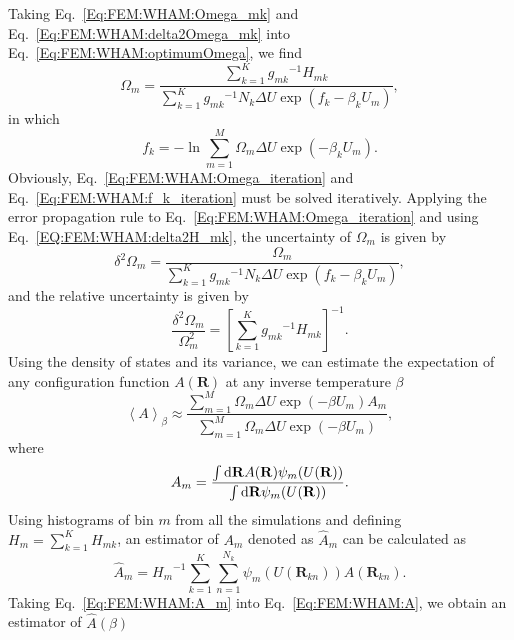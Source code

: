 Taking Eq.~\ref{Eq:FEM:WHAM:Omega_mk} and Eq.~\ref{Eq:FEM:WHAM:delta2Omega_mk} into Eq.~\ref{Eq:FEM:WHAM:optimumOmega}, we find
\begin{equation}
\Omega_m=\frac{\sum\limits_{k=1}^{K}{g_{mk}}^{-1}H_{mk}}{\sum\limits_{k=1}^{K}{g_{mk}}^{-1}N_k\Delta U\exp{(f_k-\beta_kU_m)}},
\label{Eq:FEM:WHAM:Omega_iteration}
\end{equation}
in which
\begin{equation}
f_k=-\ln\sum\limits_{m=1}^M\Omega_m\Delta U\exp{(-\beta_kU_m)}.
\label{Eq:FEM:WHAM:f_k_iteration}
\end{equation}
Obviously, Eq.~\ref{Eq:FEM:WHAM:Omega_iteration} and Eq.~\ref{Eq:FEM:WHAM:f_k_iteration} must be solved iteratively.
Applying the error propagation rule to Eq.~\ref{Eq:FEM:WHAM:Omega_iteration} and using Eq.~\ref{EQ:FEM:WHAM:delta2H_mk}, the uncertainty of $\Omega_m$ is given by
\begin{equation}
\delta^2 \Omega_m=\frac{\Omega_m}{\sum\limits_{k=1}^K{g_{mk}}^{-1}N_k\Delta U\exp{(f_k-\beta_kU_m)}},
\end{equation}
and the relative uncertainty is given by
\begin{equation}
\frac{\delta^2\Omega_m}{\Omega_m^2}=\left[\sum\limits_{k=1}^K{g_{mk}}^{-1}H_{mk}\right]^{-1}.
\end{equation}
Using the density of states and its variance, we can estimate the expectation of any configuration function $A(\mathbf{R})$ at any inverse temperature $\beta$
\begin{equation}
\left<A\right>_\beta\approx\frac{\sum\limits_{m=1}^M\Omega_m\Delta U\exp{(-\beta U_m)}A_m}{\sum\limits_{m=1}^M\Omega_m\Delta U\exp{(-\beta U_m)}},
\label{Eq:FEM:WHAM:A}
\end{equation}
where
\begin{equation}
A_m=\frac{\int \mathop{}\!\mathrm{d}\mathbf{R}A(\mathbf{R})\psi_m(U(\mathbf{R}))}{\int \mathop{}\!\mathrm{d}\mathbf{R}\psi_m(U(\mathbf{R}))}.
\end{equation}
Using histograms of bin $m$ from all the simulations and defining $H_m=\sum\limits_{k=1}^KH_{mk}$, an estimator of $A_m$ denoted as $\hat{A}_m$ can be calculated as
\begin{equation}
   \hat{A}_m={H_{m}}^{-1}\sum\limits_{k=1}^K\sum\limits_{n=1}^{N_k}\psi_m(U(\mathbf{R}_{kn}))A(\mathbf{R}_{kn}).
   \label{Eq:FEM:WHAM:A_m}
\end{equation}
Taking Eq.~\ref{Eq:FEM:WHAM:A_m} into Eq.~\ref{Eq:FEM:WHAM:A}, we obtain an estimator of $\hat{A}(\beta)$
